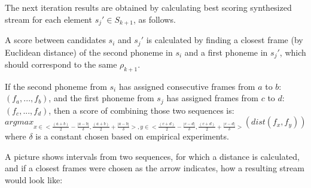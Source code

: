 \documentclass[12pt,a4paper,english]{article}
\begin{document}
The next iteration results are obtained by calculating best scoring synthesized stream for each element $s_j' \in S_{k+1}$, as follows. \newline

A score between candidates $s_i$ and $s_j'$ is calculated by finding a closest frame (by Euclidean distance) of the second phoneme in $s_i$ and a first phoneme in $s_j'$, which should correspond to the same $\rho_{k+1}$. \newline

If the second phoneme from $s_i$ has assigned consecutive frames from $a$ to $b$: $(f_a, ..., f_b)$, \newline
and the first phoneme from $s_j$ has assigned frames from $c$ to $d$: $(f_c, ..., f_d)$, \newline
then a score of combining those two sequences is:
\begin{equation}
    argmax_{x \in <\frac {(a + b)} 2 - \frac {|a - b|} \delta, \frac {(a + b)} 2 + \frac {|a - b|} \delta>, y \in <\frac {(c + d)} 2 - \frac {|c - d|} \delta, \frac {(c + d)} 2 + \frac {|c - d|} \delta>}(dist(f_x, f_y))
\end{equation}
where $\delta$ is a constant chosen based on empirical experiments. \newline

A picture shows intervals from two sequences, for which a distance is calculated, and if a closest frames were chosen as the arrow indicates, how a resulting stream would look like:
\end{document}
